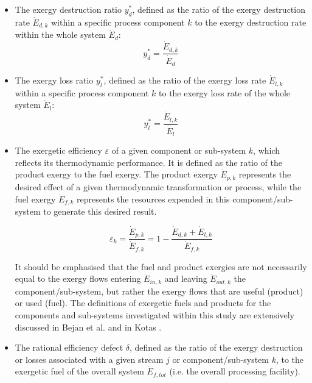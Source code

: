 \documentclass[final,times,5p]{elsarticle}
\begin{document}
	\begin{itemize}	
	
	\item The exergy destruction ratio $y_{d}^{*}$, defined as the ratio of the exergy destruction rate $\dot{E}_{d,k}$ within a specific process component $k$ to the exergy destruction rate within the whole system $\dot{E}_{d}$:  
	\begin{equation} y_{d}^{*}=\frac{\dot{E}_{d,k}}{\dot{E}_{d}} \end{equation}
	
	\item The exergy loss ratio $y_{l}^{*}$, defined as the ratio of the exergy loss rate $\dot{E}_{l,k}$ within a specific process component $k$ to the exergy loss rate of the whole system $\dot{E}_{l}$:  
	\begin{equation} y_{l}^{*}=\frac{\dot{E}_{l,k}}{\dot{E}_{l}} \end{equation}
	
	\item The exergetic efficiency $\varepsilon$ of a given component or sub-system $k$, which reflects its thermodynamic performance. It is defined as the ratio of the product exergy to the fuel exergy. The product exergy $\dot{E}_{p,k}$ represents the desired effect of a given thermodynamic transformation or process, while the fuel exergy $\dot{E}_{f,k}$ represents the resources expended in this component/sub-system to generate this desired result. 
		
	\begin{equation}
		\varepsilon_k=\frac{\dot{E}_{p,k}}{\dot{E}_{f,k}}=1-\frac{\dot{E}_{d,k}+\dot{E}_{l,k}}{\dot{E}_{f,k}}
	\end{equation}
	
	It should be emphasised that the fuel and product exergies are not necessarily equal to the exergy flows entering $\dot{E}_{in,k}$ and leaving $\dot{E}_{out,k}$ the component/sub-system, but rather the exergy flows that are useful (product) or used (fuel). The definitions of exergetic fuels and products for the components and sub-systems investigated within this study are extensively discussed in Bejan et al. \cite{BejanAdrian;TsatsaronisGeorge;Moran1996} and in Kotas \cite{Kotas1980,Kotas1980a,Kotas1995}. 
	
	\item The rational efficiency defect $\delta$, defined as the ratio of the exergy destruction or losses associated with a given stream $j$ or component/sub-system $k$, to the exergetic fuel of the overall system $\dot{E}_{f,tot}$ (i.e. the overall processing facility).
	

\end{itemize}
\end{document}
